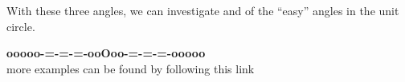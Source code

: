 \documentclass{ximera}
\begin{document}
With these three angles, we can investigate and of the ``easy'' angles in the unit circle.


















\begin{center}
\textbf{\textcolor{green!50!black}{ooooo-=-=-=-ooOoo-=-=-=-ooooo}} \\

more examples can be found by following this link\\ 

\end{center}
\end{document}
